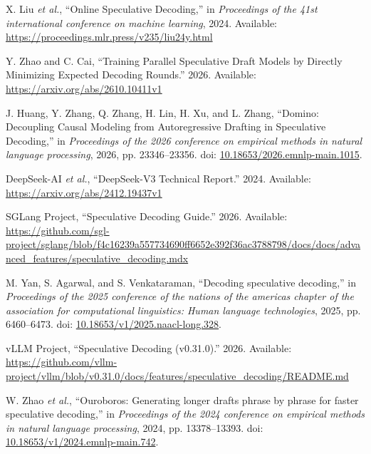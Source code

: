 \documentclass[11pt,a4paper,UTF8,fontset=none,scheme=plain,zihao=-4]{ctexart}
\newenvironment{CSLReferences}[2]{%
  \footnotesize
  \raggedright
  \setlength{\leftskip}{3em}%
  \setlength{\parindent}{-3em}%
  \setlength{\parskip}{0.1\baselineskip}%
  \sloppy
}{}
\newcommand{\CSLLeftMargin}[1]{\makebox[3em][l]{#1}}
\newcommand{\CSLRightInline}[1]{#1}
\begin{document}
\begin{CSLReferences}{0}{0}
\leavevmode{}%
\CSLLeftMargin{{[}59{]} }
\CSLRightInline{X. Liu \emph{et al.}, {``{Online Speculative
Decoding},''} in \emph{Proceedings of the 41st international conference
on machine learning}, 2024. Available:
\url{https://proceedings.mlr.press/v235/liu24y.html}}

\leavevmode{}%
\CSLLeftMargin{{[}60{]} }
\CSLRightInline{Y. Zhao and C. Cai, {``{Training Parallel Speculative
Draft Models by Directly Minimizing Expected Decoding Rounds}.''} 2026.
Available: \url{https://arxiv.org/abs/2610.10411v1}}

\leavevmode{}%
\CSLLeftMargin{{[}61{]} }
\CSLRightInline{J. Huang, Y. Zhang, Q. Zhang, H. Lin, H. Xu, and L.
Zhang, {``{Domino: Decoupling Causal Modeling from Autoregressive
Drafting in Speculative Decoding},''} in \emph{Proceedings of the 2026
conference on empirical methods in natural language processing}, 2026,
pp. 23346--23356. doi:
\href{https://doi.org/10.18653/2026.emnlp-main.1015}{10.18653/2026.emnlp-main.1015}.}

\leavevmode{}%
\CSLLeftMargin{{[}62{]} }
\CSLRightInline{DeepSeek-AI \emph{et al.}, {``{DeepSeek-V3 Technical
Report}.''} 2024. Available: \url{https://arxiv.org/abs/2412.19437v1}}

\leavevmode{}%
\CSLLeftMargin{{[}63{]} }
\CSLRightInline{SGLang Project, {``{Speculative Decoding Guide}.''}
2026. Available:
\url{https://github.com/sgl-project/sglang/blob/f4c16239a557734690ff6652e392f36ac3788798/docs/docs/advanced_features/speculative_decoding.mdx}}

\leavevmode{}%
\CSLLeftMargin{{[}64{]} }
\CSLRightInline{M. Yan, S. Agarwal, and S. Venkataraman, {``Decoding
speculative decoding,''} in \emph{Proceedings of the 2025 conference of
the nations of the americas chapter of the association for computational
linguistics: Human language technologies}, 2025, pp. 6460--6473. doi:
\href{https://doi.org/10.18653/v1/2025.naacl-long.328}{10.18653/v1/2025.naacl-long.328}.}

\leavevmode{}%
\CSLLeftMargin{{[}65{]} }
\CSLRightInline{vLLM Project, {``{Speculative Decoding (v0.31.0)}.''}
2026. Available:
\url{https://github.com/vllm-project/vllm/blob/v0.31.0/docs/features/speculative_decoding/README.md}}

\leavevmode{}%
\CSLLeftMargin{{[}66{]} }
\CSLRightInline{W. Zhao \emph{et al.}, {``{Ouroboros}: Generating longer
drafts phrase by phrase for faster speculative decoding,''} in
\emph{Proceedings of the 2024 conference on empirical methods in natural
language processing}, 2024, pp. 13378--13393. doi:
\href{https://doi.org/10.18653/v1/2024.emnlp-main.742}{10.18653/v1/2024.emnlp-main.742}.}


\end{CSLReferences}
\end{document}
